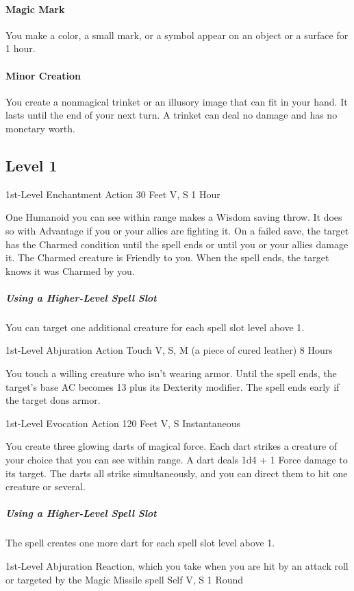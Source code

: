 \documentclass[letterpaper,openany,oneside,twocolumn]{book}
\begin{document}
\paragraph*{Magic Mark} You make a color, a small mark, or a symbol appear on an object or a surface for 1 hour.

\paragraph*{Minor Creation} You create a nonmagical trinket or an illusory image that can fit in your hand. It lasts until the end of your next turn. A trinket can deal no damage and has no monetary worth.

\subsection*{Level 1}
	{1st-Level Enchantment}
	{Action}
	{30 Feet}
	{V, S}
	{1 Hour}

One Humanoid you can see within range makes a Wisdom saving throw. It does so with Advantage if you or your allies are fighting it. On a failed save, the target has the Charmed condition until the spell ends or until you or your allies damage it. The Charmed creature is Friendly to you. When the spell ends, the target knows it was Charmed by you.

\subparagraph*{Using a Higher-Level Spell Slot} You can target one additional creature for each spell slot level above 1.

	{1st-Level Abjuration}
	{Action}
	{Touch}
	{V, S, M (a piece of cured leather)}
	{8 Hours}

You touch a willing creature who isn't wearing armor. Until the spell ends, the target's base AC becomes 13 plus its Dexterity modifier. The spell ends early if the target dons armor.

	{1st-Level Evocation}
	{Action}
	{120 Feet}
	{V, S}
	{Instantaneous}

You create three glowing darts of magical force. Each dart strikes a creature of your choice that you can see within range. A dart deals 1d4 + 1 Force damage to its target. The darts all strike simultaneously, and you can direct them to hit one creature or several.

\subparagraph*{Using a Higher-Level Spell Slot} The spell creates one more dart for each spell slot level above 1.

	{1st-Level Abjuration}
	{Reaction, which you take when you are hit by an attack roll or targeted by the Magic Missile spell}
	{Self}
	{V, S}
	{1 Round}
\end{document}
